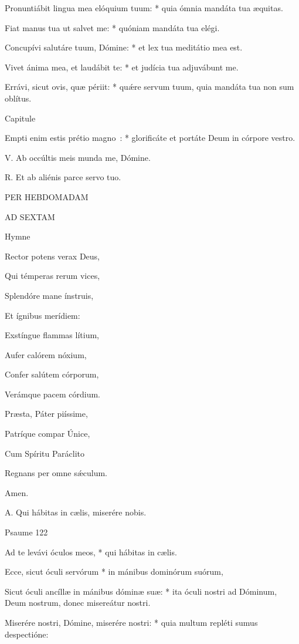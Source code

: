 Pronuntiábit lingua mea elóquium tuum: * quia ómnia mandáta tua æquitas.

Fiat manus tua ut salvet me: * quóniam mandáta tua elégi.

Concupívi salutáre tuum, Dómine: * et lex tua meditátio mea est.

Vivet ánima mea, et laudábit te: * et judícia tua adjuvábunt me.

Errávi, sicut ovis, quæ périit: * quǽre servum tuum, quia mandáta tua non sum oblítus.


Capitule

Empti enim estis prétio magno~: * glorificáte et portáte Deum in córpore vestro.


V. Ab occúltis meis munda me, Dómine.

R. Et ab aliénis parce servo tuo.









PER HEBDOMADAM

AD SEXTAM



Hymne

Rector potens verax Deus,

Qui témperas rerum vices,

Splendóre mane ínstruis,

Et ígnibus merídiem:


Exstíngue flammas lítium,

Aufer calórem nóxium,

Confer salútem córporum,

Verámque pacem córdium.


Præsta, Páter piíssime,

Patríque compar Únice,

Cum Spíritu Paráclito

Regnans per omne sǽculum.

Amen.


A. Qui hábitas in cælis, miserére nobis.


Psaume 122

Ad te levávi óculos meos, * qui hábitas in cælis.

Ecce, sicut óculi servórum * in mánibus dominórum suórum,

Sicut óculi ancíllæ in mánibus dóminæ suæ: * ita óculi nostri ad Dóminum, Deum nostrum, donec misereátur nostri.

Miserére nostri, Dómine, miserére nostri: * quia multum repléti sumus despectióne:

